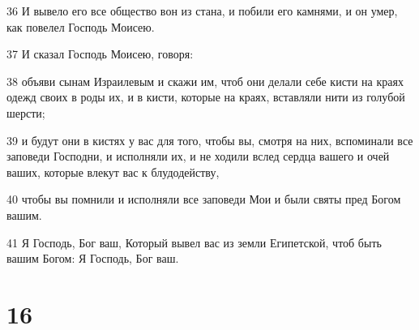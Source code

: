 \par 36 И вывело его все общество вон из стана, и побили его камнями, и он умер, как повелел Господь Моисею.
\par 37 И сказал Господь Моисею, говоря:
\par 38 объяви сынам Израилевым и скажи им, чтоб они делали себе кисти на краях одежд своих в роды их, и в кисти, которые на краях, вставляли нити из голубой шерсти;
\par 39 и будут они в кистях у вас для того, чтобы вы, смотря на них, вспоминали все заповеди Господни, и исполняли их, и не ходили вслед сердца вашего и очей ваших, которые влекут вас к блудодейству,
\par 40 чтобы вы помнили и исполняли все заповеди Мои и были святы пред Богом вашим.
\par 41 Я Господь, Бог ваш, Который вывел вас из земли Египетской, чтоб быть вашим Богом: Я Господь, Бог ваш.

\chapter{16}

